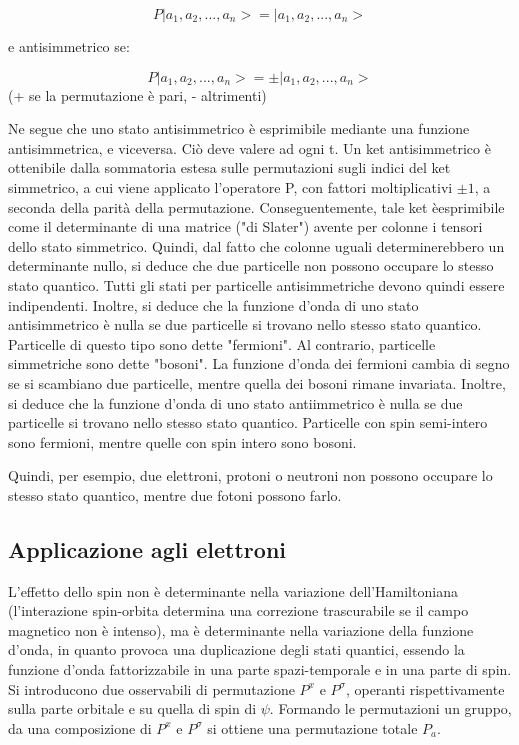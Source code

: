 \documentclass{article}
\begin{document}
\begin{equation}
    P|a_1,a_2,...,a_n>=|a_1,a_2,...,a_n>
\end{equation}

e antisimmetrico se:

\begin{equation}
    P|a_1,a_2,...,a_n>=\pm|a_1,a_2,...,a_n>
\end{equation}
(+ se la permutazione è pari, - altrimenti)

Ne segue che uno stato antisimmetrico è esprimibile mediante una funzione antisimmetrica, e viceversa.
Ciò deve valere ad ogni t.
Un ket antisimmetrico è ottenibile dalla sommatoria estesa sulle permutazioni sugli indici del ket simmetrico, a cui viene applicato l'operatore P, con fattori moltiplicativi $\pm 1$, a
seconda della parità della permutazione.
Conseguentemente, tale ket èesprimibile come il determinante di una matrice ("di Slater") avente per colonne i tensori dello stato simmetrico.
Quindi, dal fatto che colonne uguali determinerebbero un determinante nullo, si deduce che due particelle non possono occupare lo stesso stato quantico.
Tutti gli stati per particelle antisimmetriche devono quindi essere indipendenti.
Inoltre, si deduce che la funzione d'onda di uno stato antisimmetrico è nulla se due particelle si trovano nello stesso stato quantico.
Particelle di questo tipo sono dette "fermioni".
Al contrario, particelle simmetriche sono dette "bosoni".
La funzione d'onda dei fermioni cambia di segno se si scambiano due particelle, mentre quella dei bosoni rimane invariata.
Inoltre, si deduce che la funzione d'onda di uno stato antiimmetrico è nulla se due particelle si trovano nello stesso stato quantico.
Particelle con spin semi-intero sono fermioni, mentre quelle con spin intero sono bosoni.

Quindi, per esempio, due elettroni, protoni o neutroni non possono occupare lo stesso stato quantico, mentre due fotoni possono farlo.

\subsection*{Applicazione agli elettroni}
L'effetto dello spin non è determinante nella variazione dell'Hamiltoniana (l'interazione spin-orbita determina una correzione trascurabile se il campo
magnetico non è intenso), ma è determinante nella variazione della funzione d'onda, in quanto provoca una duplicazione degli stati quantici,
essendo la funzione d'onda fattorizzabile in una parte spazi-temporale e in una parte di spin.
Si introducono due osservabili di permutazione $P^x$ e $P^\sigma$, operanti rispettivamente sulla parte orbitale e su quella di spin di $\psi$.
Formando le permutazioni un gruppo, da una composizione di $P^x$ e $P^\sigma$ si ottiene una permutazione totale $P_a$.
\end{document}
